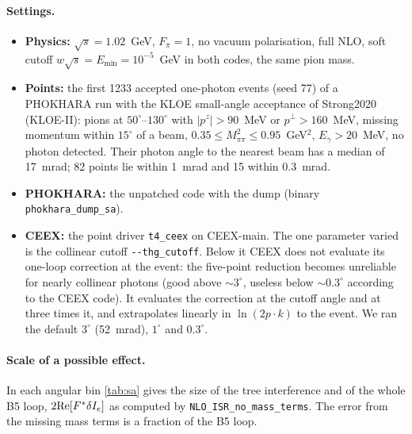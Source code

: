 \documentclass[11pt,a4paper]{article}
\newcommand{\code}[1]{\texttt{#1}}
\newcommand{\phok}{PHOKHARA}
\newcommand{\ceex}{CEEX}
\begin{document}
\paragraph{Settings.}
\begin{itemize}
\item \textbf{Physics:} $\sqrt s=1.02$~GeV, $F_\pi=1$, no vacuum polarisation, full NLO, soft
  cutoff $w\sqrt s=E_{\min}=10^{-5}$~GeV in both codes, the same pion mass.
\item \textbf{Points:} the first 1233 accepted one-photon events (seed 77) of a \phok{} run with
  the KLOE small-angle acceptance of Strong2020 (KLOE-II): pions at $50^\circ$--$130^\circ$ with
  $|p^z|>90$~MeV or $p^\perp>160$~MeV, missing momentum within $15^\circ$ of a beam,
  $0.35\le M^2_{\pi\pi}\le0.95$~GeV$^2$, $E_\gamma>20$~MeV, no photon detected. Their photon angle
  to the nearest beam has a median of 17~mrad; 82 points lie within 1~mrad and 15 within
  0.3~mrad.
\item \textbf{\phok{}:} the unpatched code with the dump (binary \code{phokhara\_dump\_sa}).
\item \textbf{\ceex{}:} the point driver \code{t4\_ceex} on \ceex-main. The one parameter varied is
  the collinear cutoff \code{-{}-thg\_cutoff}. Below it \ceex{} does not evaluate its one-loop
  correction at the event: the five-point reduction becomes unreliable for nearly collinear
  photons (good above $\sim3^\circ$, useless below $\sim0.3^\circ$ according to the \ceex{}
  code). It evaluates the correction at the cutoff angle and at three times it, and
  extrapolates linearly in $\ln(2p\cdot k)$ to the event. We ran the default $3^\circ$
  (52~mrad), $1^\circ$ and $0.3^\circ$.
\end{itemize}

\paragraph{Scale of a possible effect.} In each angular bin \cref{tab:sa} gives the size of the
tree interference and of the whole B5 loop, $2{\rm Re}[F^*\delta I_e]$ as computed by
\code{NLO\_ISR\_no\_mass\_terms}. The error from the missing mass terms is a fraction of the B5
loop.
\end{document}
